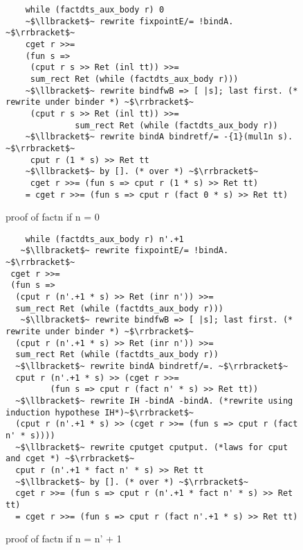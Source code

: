 \documentclass[japanese]{jssst_ppl}
\theoremstyle{definition}
\begin{document}
\begin{figure}[H]
  \centering
  \begin{verbatim}
    while (factdts_aux_body r) 0
    ~$\llbracket$~ rewrite fixpointE/= !bindA. ~$\rrbracket$~
    cget r >>=
    (fun s =>
     (cput r s >> Ret (inl tt)) >>=
     sum_rect Ret (while (factdts_aux_body r)))
    ~$\llbracket$~ rewrite bindfwB => [ |s]; last first. (* rewrite under binder *) ~$\rrbracket$~
     (cput r s >> Ret (inl tt)) >>=
              sum_rect Ret (while (factdts_aux_body r))
    ~$\llbracket$~ rewrite bindA bindretf/= -{1}(mul1n s). ~$\rrbracket$~ 
     cput r (1 * s) >> Ret tt
    ~$\llbracket$~ by []. (* over *) ~$\rrbracket$~
     cget r >>= (fun s => cput r (1 * s) >> Ret tt)
    = cget r >>= (fun s => cput r (fact 0 * s) >> Ret tt)
    \end{verbatim}

  \iffalse
  \fi
  \caption{proof of factn if n =  0 }
\end{figure}


\begin{figure}[H]
  \centering
  \begin{verbatim}
    while (factdts_aux_body r) n'.+1
   ~$\llbracket$~ rewrite fixpointE/= !bindA. ~$\rrbracket$~
 cget r >>=
 (fun s =>
  (cput r (n'.+1 * s) >> Ret (inr n')) >>=
  sum_rect Ret (while (factdts_aux_body r)))
   ~$\llbracket$~ rewrite bindfwB => [ |s]; last first. (* rewrite under binder *) ~$\rrbracket$~
  (cput r (n'.+1 * s) >> Ret (inr n')) >>=
  sum_rect Ret (while (factdts_aux_body r))
  ~$\llbracket$~ rewrite bindA bindretf/=. ~$\rrbracket$~
  cput r (n'.+1 * s) >> (cget r >>=
         (fun s => cput r (fact n' * s) >> Ret tt))
  ~$\llbracket$~ rewrite IH -bindA -bindA. (*rewrite using induction hypothese IH*)~$\rrbracket$~
  (cput r (n'.+1 * s) >> (cget r >>= (fun s => cput r (fact n' * s))))
  ~$\llbracket$~ rewrite cputget cputput. (*laws for cput and cget *) ~$\rrbracket$~
  cput r (n'.+1 * fact n' * s) >> Ret tt
  ~$\llbracket$~ by []. (* over *) ~$\rrbracket$~
  cget r >>= (fun s => cput r (n'.+1 * fact n' * s) >> Ret tt)
  = cget r >>= (fun s => cput r (fact n'.+1 * s) >> Ret tt)

       \end{verbatim}

  \iffalse
    \begin{verbatim}
    while (factdts_aux_body r) n'.+1
 |《 fixpointE 》|
 cget r >>=
 (fun s : coq_type N ml_int =>
  (cput r (n'.+1 * s) >> Ret (inr n')) >>=
  sum_rect Ret (while (factdts_aux_body r)))
  |《 rewrite under cget r >>= by bindfwB 》|
  (cput r (n'.+1 * a) >> Ret (inr n')) >>=
  sum_rect Ret (while (factdts_aux_body r))
  |《 fixpointE 》|
  cput r (n'.+1 * a) >> (cget r >>=
         (fun s : coq_type N ml_int => cput r (fact n' * s) >> Ret tt))
  |《 fixpointE 》|
  cput r (n'.+1 * fact n' * a) >> Ret tt
  |《 over 》|
  cget r >>= (fun s : coq_type N ml_int => cput r (n'.+1 * fact n' * s) >> Ret tt)

       \end{verbatim}
  \fi
  \caption{proof of factn if n =  n' + 1 }
\end{figure}
\end{document}
